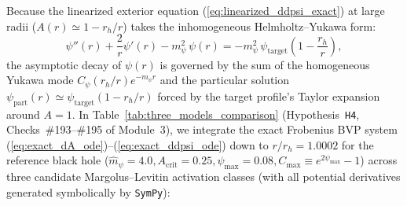 \documentclass[11pt,a4paper]{article}
\theoremstyle{definition}
\theoremstyle{remark}
\begin{document}
Because the linearized exterior equation (\ref{eq:linearized_ddpsi_exact}) at large radii ($A(r) \simeq 1 - r_h/r$) takes the inhomogeneous Helmholtz--Yukawa form:
\begin{equation}
  \psi''(r) + \frac{2}{r}\psi'(r) - m_{\psi}^2\,\psi(r) = -m_{\psi}^2\,\psi_{\text{target}}\!\left(1 - \frac{r_h}{r}\right),
  \label{eq:inhomogeneous_yukawa_forcing}
\end{equation}
the asymptotic decay of $\psi(r)$ is governed by the sum of the homogeneous Yukawa mode $C_{\psi}(r_h/r)e^{-m_{\psi}r}$ and the particular solution $\psi_{\text{part}}(r) \simeq \psi_{\text{target}}(1 - r_h/r)$ forced by the target profile's Taylor expansion around $A = 1$. In Table~\ref{tab:three_models_comparison} (Hypothesis~\texttt{H4}, Checks~\#193--\#195 of Module~3), we integrate the exact Frobenius BVP system (\ref{eq:exact_dA_ode})--(\ref{eq:exact_ddpsi_ode}) down to $r/r_h = 1.0002$ for the reference black hole ($\hat{m}_{\psi} = 4.0, A_{\text{crit}} = 0.25, \psi_{\max} = 0.08, C_{\max} \equiv e^{2\psi_{\max}} - 1$) across three candidate Margolus--Levitin activation classes (with all potential derivatives generated symbolically by \texttt{SymPy}):
\end{document}
